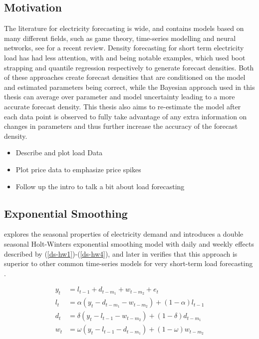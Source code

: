 \documentclass[12pt,a4paper]{article}%
\numberwithin{equation}{section}
\begin{document}
\subsection{Motivation}

The literature for electricity forecasting is wide, and contains models based on many different fields, such as game theory, time-series modelling and neural networks, see \citet{Weron2014} for a recent review. Density forecasting for short term electricity load has had less attention, with \citet{Fan2012} and \citet{He2016} being notable examples, which used boot strapping and quantile regression respectively to generate forecast densities. Both of these approaches create forecast densities that are conditioned on the model and estimated parameters being correct, while the Bayesian approach used in this thesis can average over parameter and model uncertainty leading to a more accurate forecast density. This thesis also aims to re-estimate the model after each data point is observed to fully take advantage of any extra information on changes in parameters and thus further increase the accuracy of the forecast density. 


\begin{itemize}
\item Describe and plot load Data
\item Plot price data to emphasize price spikes
\item Follow up the intro to talk a bit about load forecasting
\end{itemize}

\subsection{Exponential Smoothing}

\citet{Taylor2003} explores the seasonal properties of electricity demand and introduces a double seasonal Holt-Winters exponential smoothing model with daily and weekly effects described by (\ref{ds-hw1})-(\ref{ds-hw4}), and later in \citet{Taylor2008} verifies that this approach is superior to other common time-series models for very short-term load forecasting \citep{Taylor2008}.

\begin{align}
y_t &= l_{t-1} + d_{t-m_1} + w_{t-m_2} + e_t \label{ds-hw1} \\
l_t &= \alpha (y_t - d_{t-m_1} - w_{t-m_2}) + (1 - \alpha)l_{t-1} \label{ds-hw2}\\
d_t &= \delta (y_t - l_{t-1} - w_{t-m_2}) + (1 - \delta)d_{t-m_1} \label{ds-hw3} \\
w_t &= \omega (y_t - l_{t-1} - d_{t-m_1}) + (1 - \omega)w_{t-m_2} \label{ds-hw4}
\end{align}
\end{document}
